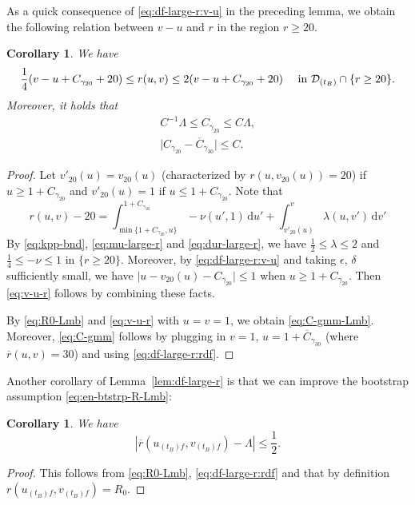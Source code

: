 \documentclass[10pt, reqno]{amsart}
\newtheorem{corollary}[theorem]{Corollary}
\theoremstyle{definition}
\theoremstyle{remark}
\theoremstyle{conjecture}
\numberwithin{equation}{section}
\newcommand{\abs}[1]{\vert#1\vert}
\newcommand{\set}[1]{\{#1\}}
\newcommand{\ud}{\mathrm{d}}
\newcommand{\0}{\emptyset}
\newcommand{\gmm}{\gamma}
\newcommand{\eps}{\epsilon}
\newcommand{\lmb}{\lambda}
\newcommand{\Lmb}{\Lambda}
\newcommand{\calD}{\mathcal D}
\newcommand{\dur}{\nu}
\newcommand{\dvr}{\lmb}
\newcommand{\f}{\frac}
\newcommand{\de}{\delta}
\newcommand{\rbg}{\overline{r}}					%
\begin{document}
As a quick consequence of \eqref{eq:df-large-r:v-u} in the preceding lemma, we obtain the following relation between $v-u$ and $r$ in the region $r \geq 20$.
\begin{corollary} \label{cor:v-u-r}
We have
\begin{equation} \label{eq:v-u-r}
	\frac{1}{4} (v - u + C_{\gmm_{20}} + 20) \leq r(u, v) \leq 2 (v - u + C_{\gmm_{20}} + 20) \quad \hbox{ in } \calD_{(t_{B})} \cap \set{r \geq 20}.
\end{equation}
Moreover, it holds that
\begin{gather} 
C^{-1} \Lmb \leq C_{\gmm_{20}} \leq  C \Lmb, \label{eq:C-gmm-Lmb} \\
\abs{C_{\gmm_{20}} - \overline{C}_{\gmm_{30}}} \leq C. \label{eq:C-gmm}
\end{gather}
\end{corollary}
\begin{proof}
Let $v'_{20}(u) = v_{20}(u)$ (characterized by $r(u, v_{20}(u)) = 20$) if $u \geq 1 + C_{\gmm_{20}}$ and $v'_{20}(u) = 1$ if $u \leq 1 + C_{\gmm_{20}}$. Note that
\begin{equation*}
	r(u, v) - 20= \int_{\min \set{1+C_{\gmm_{20}}, u}}^{1+C_{\gmm_{20}}} -\dur (u', 1) \, \ud u' + \int_{v'_{20}(u)}^{v} \dvr (u, v') \, \ud v'
\end{equation*}
By \eqref{eq:kpp-bnd}, \eqref{eq:mu-large-r} and \eqref{eq:dur-large-r}, we have $\frac{1}{2} \leq \dvr \leq 2$ and $\frac{1}{4} \leq - \dur \leq 1$ in $\set{r \geq 20}$. Moreover, by \eqref{eq:df-large-r:v-u} and taking $\eps$, $\de$ sufficiently small, we have $\abs{u - v_{20}(u) - C_{\gmm_{20}}} \leq 1$ when $u \geq 1 + C_{\gmm_{20}}$. Then \eqref{eq:v-u-r} follows by combining these facts. 

By \eqref{eq:R0-Lmb} and \eqref{eq:v-u-r} with $u = v = 1$, we obtain \eqref{eq:C-gmm-Lmb}. Moreover, \eqref{eq:C-gmm} follows by plugging in $v = 1$, $u = 1 + \overline{C}_{\gmm_{30}}$ (where $\rbg(u, v) = 30$) and using \eqref{eq:df-large-r:rdf}.  \qedhere
\end{proof}

Another corollary of Lemma~\ref{lem:df-large-r} is that we can improve the bootstrap assumption \eqref{eq:en-btstrp-R-Lmb}:

\begin{corollary}\label{cor:rbg-uf-vf-Lmb}
We have
$$|\rbg(u_{(t_B)f}, v_{(t_B)f})-\Lambda|\leq \f 12.$$
\end{corollary}
\begin{proof}
This follows from \eqref{eq:R0-Lmb}, \eqref{eq:df-large-r:rdf} and that by definition $r(u_{(t_B)f}, v_{(t_B)f})=R_0$. \qedhere
\end{proof}
\end{document}
